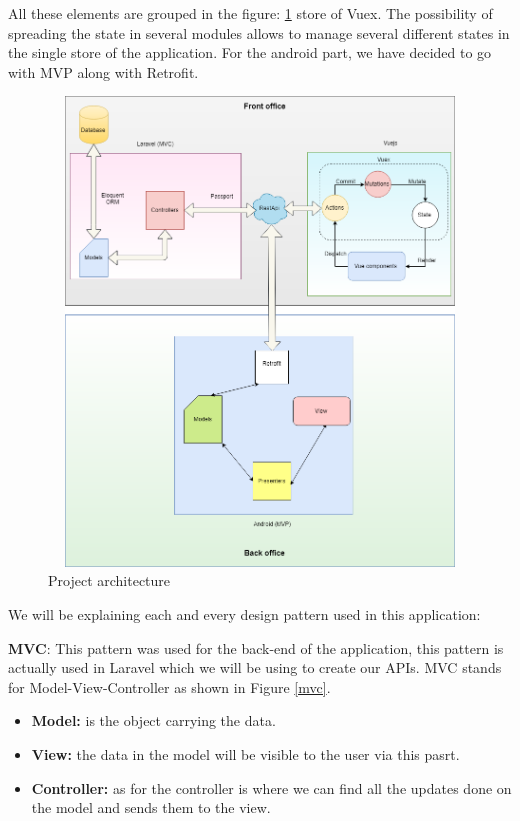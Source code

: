 \documentclass[12pt,a4paper]{report}
\begin{document}
All these elements are grouped in the figure: \ref{label-archi} store of Vuex. The possibility of spreading
the state in several modules allows to manage several different states in the single store of
the application. For the android part, we have decided to go with MVP along with Retrofit.\par
\begin{figure}[H]
	\centering
	\includegraphics[width=5.5in,height=4.9in]{archi.png}
	\caption{Project architecture}
	\label{label-archi}
\end{figure}
 We will be explaining each and every design pattern used in this application:\par
\textbf{MVC}: This pattern was used for the back-end of the application, this pattern is actually used in Laravel which we will be using to create our APIs. MVC stands for Model-View-Controller as shown in Figure \ref{mvc}. \cite{mvc}\par 
\begin{itemize}
	\item \textbf{Model:} is the object carrying the data.
	\item \textbf{View:} the data in the model will be visible to the user via this pasrt.
	\item \textbf{Controller:} as for the controller is where we can find all the updates done on the model and sends them to the view.
\end{itemize}
\end{document}
